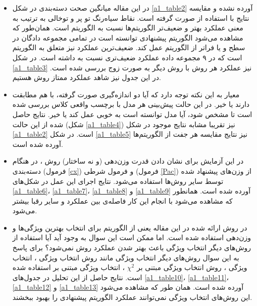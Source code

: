 \documentclass[12pt, a4paper]{article}
\begin{document}
\begin{itemize}
    \item در این مقاله میانگین صحت دسته‌بندی در شکل \ref{a1_table2} آورده نشده و
          مقایسه نتایج با استفاده از  صورت گرفته است. نقاط  سیاه‌رنگ
          تو پر و توخالی به ترتیب به معنی عملکرد بهتر و ضعیف‌تر الگوریتم‌ها نسبت به الگوریتم
           است. همان‌طور که مشاهده می‌شود الگوریتم پیشنهادی توانسته است در تمامی مجموعه دادگان
          در سطح و یا فراتر از الگوریتم  عمل کند. ضعیف‌ترین عملکرد نیز متعلق
          به الگوریتم  است که در ۹ مجموعه داده عملکرد ضعیف‌تری نسبت به 
          داشته است. در شکل \ref{a1_table3} نیز عملکرد هر روش با روش دیگر به صورت زوج
          بررسی شده است. در این جدول نیز شاهد عملکرد ممتاز روش  هستیم.
    \item معیار  به این نکته توجه دارد که آیا دو اندازه‌گیری صورت گرفته،
          با هم مطابقت دارند یا خیر. در این حالت پیش‌بینی هر مدل با برچسب واقعی کلاس
          بررسی شده است تا مشخص شود، آیا مدل توانسته است به خوبی عمل کند یا خیر.
          نتایج حاصل شده از این حالت (شکل \ref{a1_table4})
          نیز تقریبا مشابه نتایج موجود در شکل \ref{a1_table2}
          است. در شکل \ref{a1_table5} نیز نتایج مقایسه هر جفت از الگوریتم‌ها آورده شده است.
    \item در این آزمایش برای نشان دادن قدرت وزن‌دهی (و نه ساختار) روش ،
          در هنگام دسته‌بندی (فرمول \ref{cx}) و فرمول شرطی (فرمول \ref{Pac}) از وزن‌های
          پیشنهاد شده توسط سایر روش‌ها استفاده می‌شود. نتایج اجرای این عمل در شکل‌های
          \ref{a1_table6}، \ref{a1_table7}، \ref{a1_table8} و \ref{a1_table9} آورده شده است.
          همانطور که مشاهده می‌شود با انجام این کار فاصله‌ی بین عملکرد  و سایر
          رقبا بیشتر می‌شود.
    \item در روش ارائه شده در این مقاله یعنی  از الگوریتم 
          برای انتخاب بهترین ویژگی‌ها و وزن‌دهی استفاده شده است. اما ممکن است این سوال
          به وجود آید آیا استفاده از روش‌های دیگر انتخاب ویژگی باعث بهتر شدن عملکرد
          روش  نمی‌شود؟ برای پاسخ به این سوال روش‌های دیگر انتخاب ویژگی مانند
          روش انتخاب ویژگی  ، انتخاب ویژگی  ،
          روش انتخاب ویژگی مبتنی بر $\chi^2$ ، انتخاب ویژگی مبتنی بر
            استفاده شده است. نتایج حاصل از این تحلیل در
          جدول‌های \ref{a1_table10}، \ref{a1_table11}، \ref{a1_table12} و
          \ref{a1_table13} آورده شده است. همان طور که مشاهده می‌شود این
          روش‌های انتخاب ویژگی نمی‌توانند عملکرد الگوریتم پیشنهادی را بهبود ببخشند.

\end{itemize}
\end{document}
